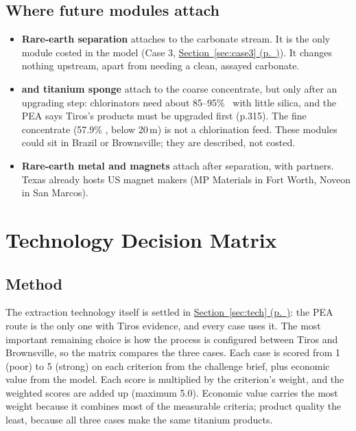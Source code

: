 \documentclass[11pt,letterpaper]{article}
\newcommand{\tio}{\ce{TiO2}}
\newcommand{\sref}[1]{\hyperref[#1]{Section~\ref*{#1} (p.~\pageref*{#1})}}
\begin{document}
\subsection{Where future modules attach}\label{sec:modules}
\begin{itemize}
\item \textbf{Rare-earth separation} attaches to the carbonate stream. It is the only module costed in the model (Case 3, \sref{sec:case3}). It changes nothing upstream, apart from needing a clean, assayed carbonate.
\item \textbf{ and titanium sponge} attach to the coarse concentrate, but only after an upgrading step: chlorinators need about 85--95\% \tio\ with little silica, and the PEA says Tiros's products must be upgraded first (p.315). The fine concentrate (57.9\% \tio, below 20\,\textmu m) is not a chlorination feed. These modules could sit in Brazil or Brownsville; they are described, not costed.
\item \textbf{Rare-earth metal and magnets} attach after separation, with partners. Texas already hosts US magnet makers (MP Materials in Fort Worth, Noveon in San Marcos).
\end{itemize}

\section{Technology Decision Matrix}\label{sec:matrix}

\subsection{Method}\label{sec:method}
The extraction technology itself is settled in \sref{sec:tech}: the PEA route is the only one with Tiros evidence, and every case uses it. The most important remaining choice is how the process is configured between Tiros and Brownsville, so the matrix compares the three cases. Each case is scored from 1 (poor) to 5 (strong) on each criterion from the challenge brief, plus economic value from the model. Each score is multiplied by the criterion's weight, and the weighted scores are added up (maximum 5.0). Economic value carries the most weight because it combines most of the measurable criteria; product quality the least, because all three cases make the same titanium products.
\end{document}
